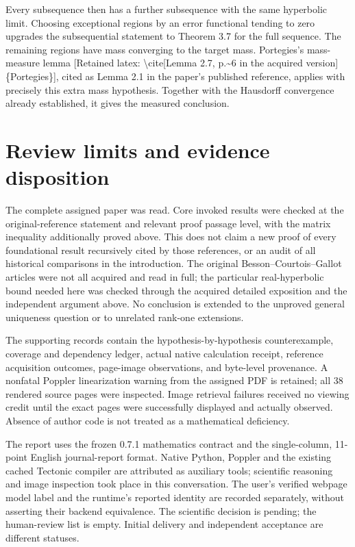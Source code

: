 \documentclass[10pt]{article}
\begin{document}
Every subsequence then has a further subsequence with the same hyperbolic limit. Choosing exceptional regions by an error functional tending to zero upgrades the subsequential statement to Theorem 3.7 for the full sequence. The remaining regions have mass converging to the target mass. Portegies’s mass-measure lemma [Retained latex: \textbackslash{}cite[Lemma 2.7, p.\textasciitilde{}6 in the acquired version]\{Portegies\}], cited as Lemma 2.1 in the paper’s published reference, applies with precisely this extra mass hypothesis. Together with the Hausdorff convergence already established, it gives the measured conclusion.\par
\section*{Review limits and evidence disposition}
The complete assigned paper was read. Core invoked results were checked at the original-reference statement and relevant proof passage level, with the matrix inequality additionally proved above. This does not claim a new proof of every foundational result recursively cited by those references, or an audit of all historical comparisons in the introduction. The original Besson–Courtois–Gallot articles were not all acquired and read in full; the particular real-hyperbolic bound needed here was checked through the acquired detailed exposition and the independent argument above. No conclusion is extended to the unproved general uniqueness question or to unrelated rank-one extensions.\par
The supporting records contain the hypothesis-by-hypothesis counterexample, coverage and dependency ledger, actual native calculation receipt, reference acquisition outcomes, page-image observations, and byte-level provenance. A nonfatal Poppler linearization warning from the assigned PDF is retained; all 38 rendered source pages were inspected. Image retrieval failures received no viewing credit until the exact pages were successfully displayed and actually observed. Absence of author code is not treated as a mathematical deficiency.\par
The report uses the frozen 0.7.1 mathematics contract and the single-column, 11-point English journal-report format. Native Python, Poppler and the existing cached Tectonic compiler are attributed as auxiliary tools; scientific reasoning and image inspection took place in this conversation. The user’s verified webpage model label and the runtime’s reported identity are recorded separately, without asserting their backend equivalence. The scientific decision is pending; the human-review list is empty. Initial delivery and independent acceptance are different statuses.\par
\end{document}
